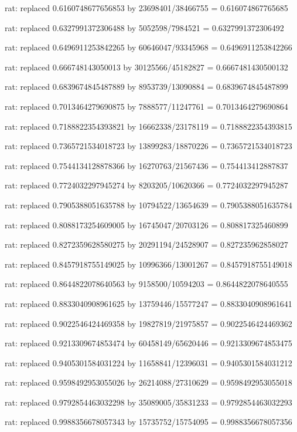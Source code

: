 \documentclass[a4paper,10pt]{article}
\begin{document}
\begin{eulernotebook}
\begin{eulercomment}
\begin{eulercomment}
\begin{eulercomment}
\begin{eulercomment}
\begin{eulercomment}
\begin{eulercomment}
\begin{eulercomment}
\begin{eulercomment}
\begin{eulercomment}
\begin{eulercomment}
\begin{eulercomment}
\begin{eulercomment}
\begin{eulercomment}
\begin{eulercomment}
\begin{eulercomment}
\begin{eulercomment}
\begin{euleroutput}
  rat: replaced 0.6160748677656853 by 23698401/38466755 = 0.616074867765685
  
  rat: replaced 0.6327991372306488 by 5052598/7984521 = 0.6327991372306492
  
  rat: replaced 0.6496911253842265 by 60646047/93345968 = 0.6496911253842266
  
  rat: replaced 0.666748143050013 by 30125566/45182827 = 0.6667481430500132
  
  rat: replaced 0.6839674845487889 by 8953739/13090884 = 0.6839674845487899
  
  rat: replaced 0.7013464279690875 by 7888577/11247761 = 0.7013464279690864
  
  rat: replaced 0.7188822354393821 by 16662338/23178119 = 0.7188822354393815
  
  rat: replaced 0.7365721534018723 by 13899283/18870226 = 0.7365721534018723
  
  rat: replaced 0.7544134128878366 by 16270763/21567436 = 0.754413412887837
  
  rat: replaced 0.7724032297945274 by 8203205/10620366 = 0.7724032297945287
  
  rat: replaced 0.7905388051635788 by 10794522/13654639 = 0.7905388051635784
  
  rat: replaced 0.8088173254609005 by 16745047/20703126 = 0.808817325460899
  
  rat: replaced 0.8272359628580275 by 20291194/24528907 = 0.827235962858027
  
  rat: replaced 0.8457918755149025 by 10996366/13001267 = 0.8457918755149018
  
  rat: replaced 0.8644822078640563 by 9158500/10594203 = 0.8644822078640555
  
  rat: replaced 0.8833040908961625 by 13759446/15577247 = 0.8833040908961641
  
  rat: replaced 0.9022546424469358 by 19827819/21975857 = 0.9022546424469362
  
  rat: replaced 0.9213309674853474 by 60458149/65620446 = 0.9213309674853475
  
  rat: replaced 0.9405301584031224 by 11658841/12396031 = 0.9405301584031212
  
  rat: replaced 0.9598492953055026 by 26214088/27310629 = 0.9598492953055018
  
  rat: replaced 0.9792854463032298 by 35089005/35831233 = 0.9792854463032293
  
  rat: replaced 0.9988356678057343 by 15735752/15754095 = 0.9988356678057356
  

\end{euleroutput}
\end{eulercomment}
\end{eulercomment}
\end{eulercomment}
\end{eulercomment}
\end{eulercomment}
\end{eulercomment}
\end{eulercomment}
\end{eulercomment}
\end{eulercomment}
\end{eulercomment}
\end{eulercomment}
\end{eulercomment}
\end{eulercomment}
\end{eulercomment}
\end{eulercomment}
\end{eulercomment}
\end{eulernotebook}
\end{document}
